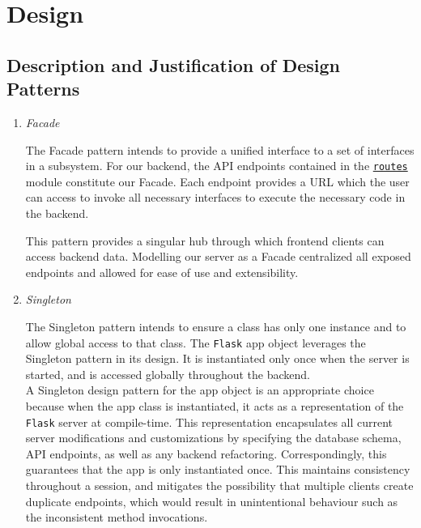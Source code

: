 \documentclass{article}
\begin{document}
\section{Design}

\subsection{Description and Justification of Design Patterns}
\begin{enumerate}
    \item \textit{Facade}
    
    The Facade pattern intends to provide a unified interface to a set of interfaces in a subsystem. 
    For our backend, the API endpoints contained in the \href{https://github.com/alextrosta/brackit/blob/master/backend/app/routes.py}{\texttt{routes}} module constitute our Facade. Each endpoint provides a URL which the user can access
    to invoke all necessary interfaces to execute the necessary code in the backend.

    This pattern provides a singular hub through which frontend clients can access backend data.
    Modelling our server as a Facade centralized all exposed endpoints and allowed for ease of use and extensibility.

    \item \textit{Singleton} 
    
    The Singleton pattern intends to ensure a class has only one instance and to allow global 
    access to that class. The \texttt{Flask} app object leverages the Singleton pattern in its design. It is instantiated only once when the server is started, and is accessed globally throughout the 
    backend. \\
    A Singleton design pattern for the app object is an appropriate choice because when the app class is instantiated, it acts as a representation of the \texttt{Flask} server at compile-time.
    This representation encapsulates all current server modifications and customizations 
    by specifying the database schema, API endpoints, as well as any backend refactoring. 
    Correspondingly, this guarantees that the app is only instantiated once. This maintains consistency throughout a session, and mitigates the possibility that multiple clients create  duplicate endpoints, which would result in unintentional behaviour such as the inconsistent method invocations.
\end{enumerate}
\end{document}
